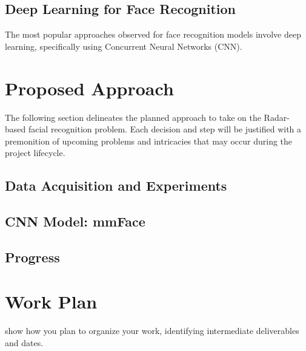 \documentclass{interim}
\begin{document}
\subsection{Deep Learning for Face Recognition}
The most popular approaches observed for face recognition models involve deep learning, specifically using Concurrent Neural Networks (CNN).


\section{Proposed Approach}
The following section delineates the planned approach to take on the Radar-based facial recognition problem. Each decision and step will be justified with a premonition of upcoming problems and intricacies that may occur during the project lifecycle.

\subsection{Data Acquisition and Experiments}


\subsection{CNN Model: mmFace}


\subsection{Progress}


\section{Work Plan}
show how you plan to organize your work, identifying intermediate deliverables and dates.



\end{document}
